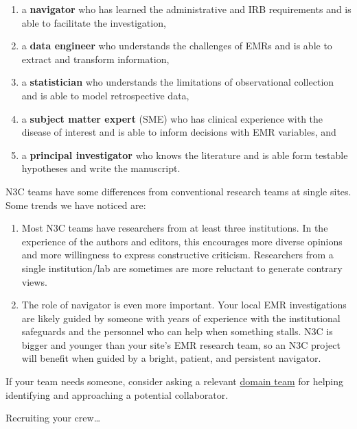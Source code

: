 \documentclass[
  letterpaper,
  DIV=11,
  numbers=noendperiod]{scrreprt}
\providecommand{\tightlist}{%
  \setlength{\itemsep}{0pt}\setlength{\parskip}{0pt}}\usepackage{longtable,booktabs,array}
\begin{document}
\begin{enumerate}
\def\labelenumi{\arabic{enumi}.}
\tightlist
\item
  a \textbf{navigator} who has learned the administrative and IRB
  requirements and is able to facilitate the investigation,
\item
  a \textbf{data engineer} who understands the challenges of EMRs and is
  able to extract and transform information,
\item
  a \textbf{statistician} who understands the limitations of
  observational collection and is able to model retrospective data,
\item
  a \textbf{subject matter expert} (SME) who has clinical experience
  with the disease of interest and is able to inform decisions with EMR
  variables, and
\item
  a \textbf{principal investigator} who knows the literature and is able
  form testable hypotheses and write the manuscript.
\end{enumerate}

N3C teams have some differences from conventional research teams at
single sites. Some trends we have noticed are:

\begin{enumerate}
\def\labelenumi{\arabic{enumi}.}
\item
  Most N3C teams have researchers from at least three institutions. In
  the experience of the authors and editors, this encourages more
  diverse opinions and more willingness to express constructive
  criticism. Researchers from a single institution/lab are sometimes are
  more reluctant to generate contrary views.
\item
  The role of navigator is even more important. Your local EMR
  investigations are likely guided by someone with years of experience
  with the institutional safeguards and the personnel who can help when
  something stalls. N3C is bigger and younger than your site's EMR
  research team, so an N3C project will benefit when guided by a bright,
  patient, and persistent navigator.
\end{enumerate}

If your team needs someone, consider asking a relevant
\protect\hyperlink{domain-teams}{domain team} for helping identifying
and approaching a potential collaborator.

\begin{tcolorbox}[enhanced jigsaw, rightrule=.15mm, colback=white, leftrule=.75mm, breakable, left=2mm, bottomtitle=1mm, opacityback=0, toprule=.15mm, colframe=quarto-callout-note-color-frame, titlerule=0mm, toptitle=1mm, coltitle=black, title={Voice of Jamie Foxx}, bottomrule=.15mm, arc=.35mm, opacitybacktitle=0.6, colbacktitle=quarto-callout-note-color!10!white]

Recruiting your crew\ldots{}

\end{tcolorbox}
\end{document}
